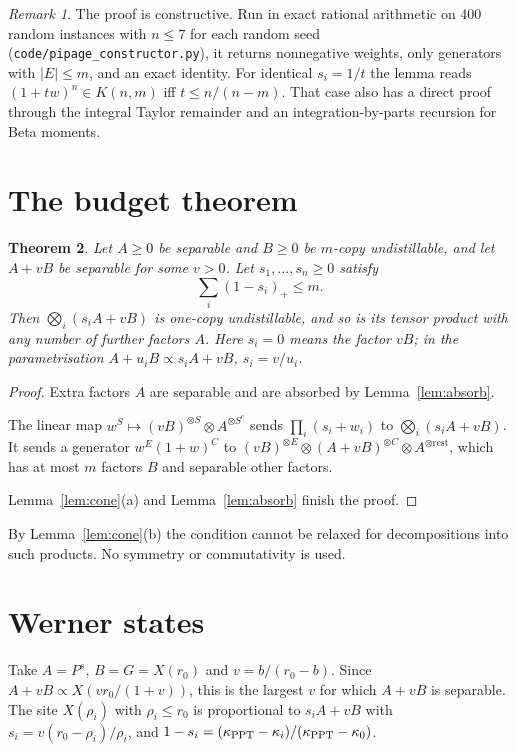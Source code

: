 \documentclass[11pt]{article}
\newtheorem{theorem}{Theorem}
\theoremstyle{remark}
\newtheorem{remark}[theorem]{Remark}
\begin{document}
\begin{remark}
The proof is constructive. Run in exact rational arithmetic on 400 random instances with $n\le7$ for each random seed (\texttt{code/pipage\_constructor.py}), it returns
nonnegative weights, only generators with $|E|\le m$, and an exact identity. For identical $s_i=1/t$ the lemma reads
$(1+tw)^n\in K(n,m)$ iff $t\le n/(n-m)$. That case also has a direct proof through the integral Taylor remainder and
an integration-by-parts recursion for Beta moments.
\end{remark}

\section{The budget theorem}
\begin{theorem}\label{thm:budget}
Let $A\ge0$ be separable and $B\ge0$ be $m$-copy undistillable, and let $A+vB$ be separable for some $v>0$. Let
$s_1,\dots,s_n\ge0$ satisfy
\[
\sum_i(1-s_i)_+\le m .
\]
Then $\bigotimes_i(s_iA+vB)$ is one-copy undistillable, and so is its tensor product with any number of further
factors $A$. Here $s_i=0$ means the factor $vB$; in the parametrisation $A+u_iB\propto s_iA+vB$, $s_i=v/u_i$.
\end{theorem}
\begin{proof}
Extra factors $A$ are separable and are absorbed by Lemma~\ref{lem:absorb}.

The linear map $w^S\mapsto(vB)^{\otimes S}\otimes A^{\otimes S^c}$ sends $\prod_i(s_i+w_i)$ to
$\bigotimes_i(s_iA+vB)$. It sends a generator $w^E(1+w)^C$ to
$(vB)^{\otimes E}\otimes(A+vB)^{\otimes C}\otimes A^{\otimes\text{rest}}$, which has at most $m$ factors $B$ and
separable other factors.

Lemma~\ref{lem:cone}(a) and Lemma~\ref{lem:absorb} finish the proof.
\end{proof}
By Lemma~\ref{lem:cone}(b) the condition cannot be relaxed for decompositions into such products. No symmetry or
commutativity is used.

\section{Werner states}
Take $A=P^s$, $B=G=X(r_0)$ and $v=b/(r_0-b)$. Since $A+vB\propto X(vr_0/(1+v))$, this is the largest $v$ for which
$A+vB$ is separable. The site $X(\rho_i)$ with $\rho_i\le r_0$ is proportional to $s_iA+vB$ with
$s_i=v(r_0-\rho_i)/\rho_i$, and $1-s_i=(\kappa_{\rm PPT}-\kappa_i)/(\kappa_{\rm PPT}-\kappa_0)$.
\end{document}
